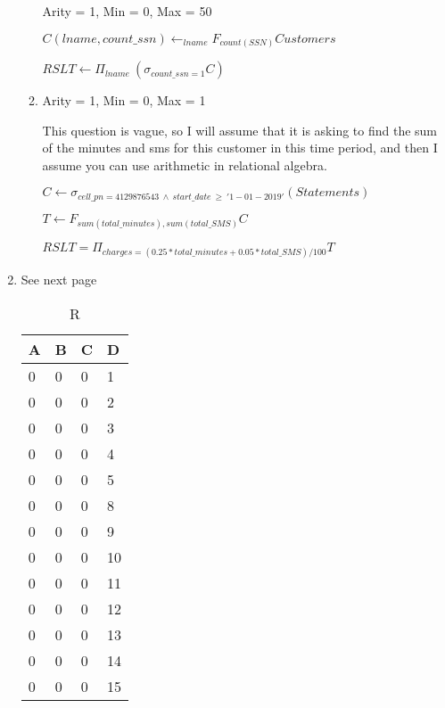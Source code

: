 \documentclass[12pt]{article}
\begin{document}
\begin{enumerate}
\begin{enumerate}
Arity = 1, Min = 0, Max = 50

$ C(lname, count\_ssn) \leftarrow _{lname} F_{count(SSN)} Customers $

$ RSLT \leftarrow \Pi_{lname} \ (\sigma_{count\_ssn = 1} C ) $

\item %
Arity = 1, Min = 0, Max = 1

This question is vague, so I will assume that it is asking to find
the sum of the minutes and sms for this customer in this time period, and then 
I assume you can use arithmetic in relational algebra. 

$ C \leftarrow \sigma_{cell\_pn = 4129876543 \ \land \ start\_date \ \geq \  '1-01-2019'} (Statements) $

$ T \leftarrow F_{sum(total\_minutes), sum(total\_SMS)} C $

$ RSLT = \Pi_{charges=(0.25 * total\_minutes + 0.05 * total\_SMS)/100} T$


\end{enumerate}

\item %

See next page


\begin{table}[]
	\caption{R}
	\centering
	\begin{tabular}{|l|l|l|l|}
	\hline
	\textbf{A} & \textbf{B} & \textbf{C} & \textbf{D} \\ \hline
	0          & 0          & 0          & 1          \\ \hline
	0          & 0          & 0          & 2          \\ \hline
	0          & 0          & 0          & 3          \\ \hline
	0          & 0          & 0          & 4          \\ \hline
	0          & 0          & 0          & 5          \\ \hline
	0          & 0          & 0          & 8          \\ \hline
	0          & 0          & 0          & 9          \\ \hline
	0          & 0          & 0          & 10         \\ \hline
	0          & 0          & 0          & 11         \\ \hline
	0          & 0          & 0          & 12         \\ \hline
	0          & 0          & 0          & 13         \\ \hline
	0          & 0          & 0          & 14         \\ \hline
	0          & 0          & 0          & 15         \\ \hline
	\end{tabular}
	\end{table}




\end{enumerate}
\end{document}
